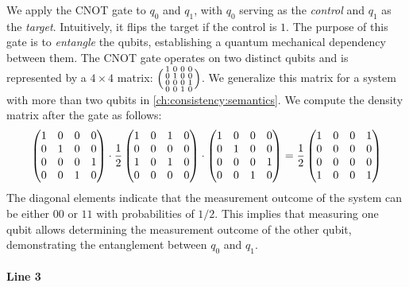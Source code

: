 We apply the CNOT gate to $q_0$ and $q_1$, with $q_0$ serving as the
\emph{control} and $q_1$ as the \emph{target}.
%
Intuitively, it flips the target if the control is $1$.
%
The purpose of this gate is to \emph{entangle} the qubits, establishing a
quantum mechanical dependency between them.
%
The CNOT gate operates on two distinct qubits and is represented by a
$4\times4$ matrix: $\Big(\begin{smallmatrix}1&0&0&0\\0&1&0&0\\0&0&0&1\\0&0&1&0\end{smallmatrix}\Big)$.
%
We generalize this matrix for a system with more than two qubits in
\cref{ch:consistency:semantics}.
%
We compute the density matrix after the gate as follows:
%
\[
	\begin{pmatrix}1&0&0&0\\0&1&0&0\\0&0&0&1\\0&0&1&0\end{pmatrix}
	\cdot
	\frac{1}{2}\begin{pmatrix}1&0&1&0\\0&0&0&0\\1&0&1&0\\0&0&0&0\end{pmatrix}
	\cdot
	\begin{pmatrix}1&0&0&0\\0&1&0&0\\0&0&0&1\\0&0&1&0\end{pmatrix}
	=\frac{1}{2}\begin{pmatrix}1&0&0&1\\0&0&0&0\\0&0&0&0\\1&0&0&1\end{pmatrix}
\]
%
The diagonal elements indicate that the measurement outcome of the system can
be either $00$ or $11$ with probabilities of $1/2$.
%
This implies that measuring one qubit allows determining the measurement
outcome of the other qubit, demonstrating the entanglement between $q_0$ and
$q_1$.

\paragraph{Line 3}

